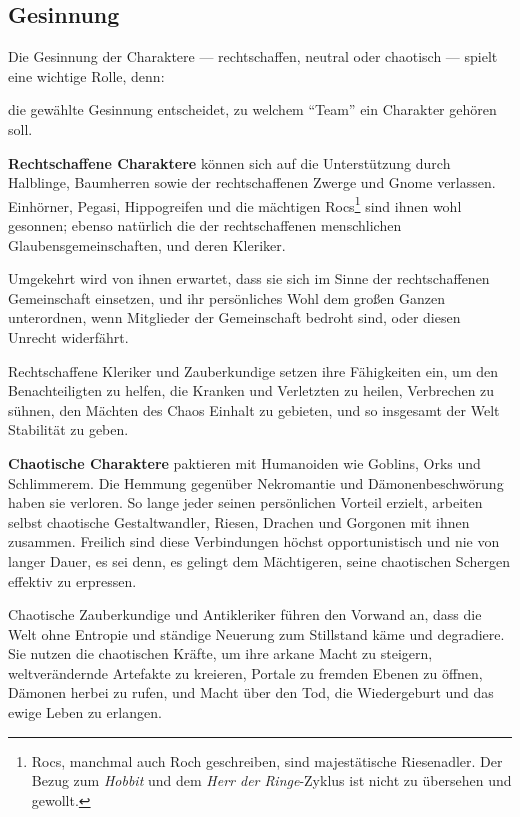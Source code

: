 \documentclass[11pt]{wbzine}
\begin{document}
\begin{multicols}{2}
    \subsection{Gesinnung}

    Die Gesinnung der Charaktere --- rechtschaffen, neutral oder
    chaotisch --- spielt eine wichtige Rolle, denn:

    \begin{tcolorbox} 
	die gewählte Gesinnung entscheidet, zu welchem ``Team'' ein
        Charakter gehören soll. 
    \end{tcolorbox}

   \textbf{Rechtschaffene Charaktere} können sich auf die
   Unterstützung durch Halblinge, Baumherren sowie der
   rechtschaffenen Zwerge und Gnome verlassen. Einhörner, Pegasi,
   Hippogreifen und die mächtigen Rocs\footnote{Rocs, manchmal auch
   Roch geschreiben, sind majestätische Riesenadler. Der Bezug zum
   \textit{Hobbit} und dem \textit{Herr der Ringe}-Zyklus ist nicht
   zu übersehen und gewollt.} sind ihnen wohl gesonnen; ebenso
   natürlich die der rechtschaffenen menschlichen
   Glaubensgemeinschaften, und deren Kleriker.

    Umgekehrt wird von ihnen erwartet, dass sie sich im Sinne der
    rechtschaffenen Gemeinschaft einsetzen, und ihr persönliches
    Wohl dem großen Ganzen unterordnen, wenn Mitglieder der
    Gemeinschaft bedroht sind, oder diesen Unrecht widerfährt.

    Rechtschaffene Kleriker und Zauberkundige setzen ihre
    Fähigkeiten ein, um den Benachteiligten zu helfen, die Kranken
    und Verletzten zu heilen, Verbrechen zu sühnen, den Mächten des
    Chaos Einhalt zu gebieten, und so insgesamt der Welt Stabilität
    zu geben. 

   \textbf{Chaotische Charaktere} paktieren mit Humanoiden wie Goblins,
    Orks und Schlimmerem. Die Hemmung gegenüber Nekromantie und
    Dämonenbeschwörung haben sie verloren. So lange jeder seinen
    persönlichen Vorteil erzielt, arbeiten selbst chaotische
    Gestaltwandler, Riesen, Drachen und Gorgonen mit ihnen zusammen.
    Freilich sind diese Verbindungen höchst opportunistisch und nie
    von langer Dauer, es sei denn, es gelingt dem Mächtigeren, seine
    chaotischen Schergen effektiv zu erpressen.

    Chaotische Zauberkundige und Antikleriker führen den Vorwand an,
    dass die Welt ohne Entropie und ständige Neuerung zum Stillstand
    käme und degradiere. Sie nutzen die chaotischen Kräfte, um ihre
    arkane Macht zu steigern, weltverändernde Artefakte zu kreieren,
    Portale zu fremden Ebenen zu öffnen, Dämonen herbei zu rufen,
    und Macht über den Tod, die Wiedergeburt und das ewige Leben zu
    erlangen.


\end{multicols}
\end{document}
